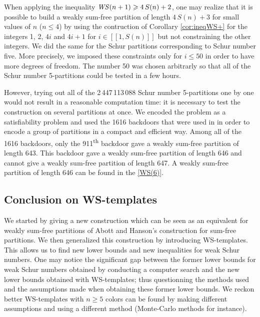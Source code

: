 When applying the inequality \(\mathit{WS}(n+1) \geqslant 4 \, S(n) + 2\), one may realize that it is possible to build a weakly 
sum-free partition of length \(4 \, S(n) + 3\) for small values of \(n\) (\(n \leqslant 4\)) by using the contruction of 
Corollary \ref{cor:ineqWS+} for the integers 1, 2, \(4i\) and \(4i+1\) for \(i \in [\![1, S(n)]\!]\) but not 
constraining the other integers. We did the same for the Schur partitions corresponding to Schur number five. More precisely, 
we imposed these constraints only for \(i \leqslant 50\) in order to have more degrees of freedom. The number 50 was chosen 
arbitrarly so that all of the Schur number 5-partitions could be tested in a few hours.

However, trying out all of the 2\,447\,113\,088 Schur number 5-partitions \cite{Heule2017} one by one would not result in a 
reasonable computation time: it is necessary to test the construction on several partitions at once. We encoded the problem as a 
satisfiability problem and used the 1616 backdoors that were used in \cite{Heule2017} in order to encode a group of partitions in 
a compact and efficient way. Among all of the 1616 backdoors, only the 911\textsuperscript{th} backdoor gave a weakly sum-free 
partition of length 643. This backdoor gave a weakly sum-free partition of length 646 and cannot give a weakly sum-free 
partition of length 647. A weakly sum-free partition of length 646 can be found in the \ref{WS(6)}.


\subsection{Conclusion on WS-templates}

We started by giving a new construction which can be seen as an equivalent for weakly sum-free partitions of Abott
and Hanson's construction for sum-free partitions. We then generalized this construction by introducing WS-templates. This
allows us to find new lower bounds and new inequalities for weak Schur numbers. One may notice the significant gap
between the former lower bounds for weak Schur numbers obtained by conducting a computer search and the new lower bounds
obtained with WS-templates; thus questionning the methods used and the assumptions made when obtaining these former lower 
bounds. We reckon better WS-templates with \(n \geqslant 5\) colors can be found by making different assumptions 
and using a different method (Monte-Carlo methods for instance).
